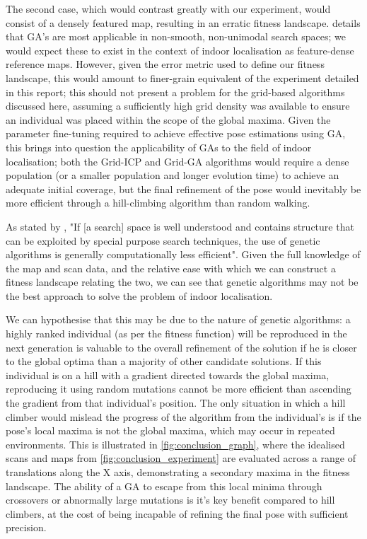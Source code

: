\documentclass[authoryearcitations]{UoYCSproject}
\begin{document}
The second case, which would contrast greatly with our experiment, would consist of a densely featured map, resulting in an erratic fitness landscape.
\citet{Mitchell1998-td} details that GA's are most applicable in non-smooth, non-unimodal search spaces; we would expect these to exist in the context of indoor localisation as feature-dense reference maps. However, given the error metric used to define our fitness landscape, this would amount to finer-grain equivalent of the experiment detailed in this report; this should not present a problem for the grid-based algorithms discussed here, assuming a sufficiently high grid density was available to ensure an individual was placed within the scope of the global maxima. Given the parameter fine-tuning required to achieve effective pose estimations using GA, this brings into question the applicability of GAs to the field of indoor localisation; both the Grid-ICP and Grid-GA algorithms would require a dense population (or a smaller population and longer evolution time) to achieve an adequate initial coverage, but the final refinement of the pose would inevitably be more efficient through a hill-climbing algorithm than random walking. \newline

As stated by \citet{Grefenstette2012-ir}, "If [a search] space is well understood and contains structure that can be exploited by special purpose search techniques, the use of genetic algorithms is generally computationally less efficient". Given the full knowledge of the map and scan data, and the relative ease with which we can construct a fitness landscape relating the two, we can see that genetic algorithms may not be the best approach to solve the problem of indoor localisation. \newline

We can hypothesise that this may be due to the nature of genetic algorithms: a highly ranked individual (as per the fitness function) will be reproduced in the next generation is valuable to the overall refinement of the solution if he is closer to the global optima than a majority of other candidate solutions. If this individual is on a hill with a gradient directed towards  the global maxima, reproducing it using random mutations cannot be more efficient than ascending the gradient from that individual's position. The only situation in which a hill climber would mislead the progress of the algorithm from the individual's is if the pose's local maxima is not the global maxima, which may occur in repeated environments. This is illustrated in \autoref{fig:conclusion_graph}, where the idealised scans and maps from \autoref{fig:conclusion_experiment} are evaluated across a range of translations along the X axis, demonstrating a secondary maxima in the fitness landscape. The ability of a GA to escape from this local minima through crossovers or abnormally large mutations is it's key benefit compared to hill climbers, at the cost of being incapable of refining the final pose with sufficient precision.\newline
\end{document}
